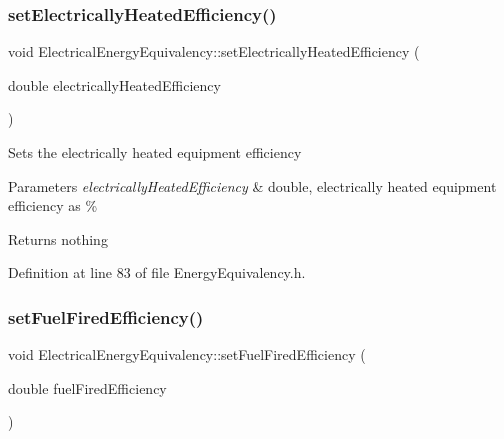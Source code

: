 \subsubsection{\texorpdfstring{set\+Electrically\+Heated\+Efficiency()}{setElectricallyHeatedEfficiency()}\hspace{0.1cm}{\footnotesize\ttfamily [3/3]}}
{\footnotesize\ttfamily void Electrical\+Energy\+Equivalency\+::set\+Electrically\+Heated\+Efficiency (\begin{DoxyParamCaption}\item[{double}]{electrically\+Heated\+Efficiency }\end{DoxyParamCaption})\hspace{0.3cm}{\ttfamily [inline]}}

Sets the electrically heated equipment efficiency


\begin{DoxyParams}{Parameters}
{\em electrically\+Heated\+Efficiency} & double, electrically heated equipment efficiency as \%\\
\hline
\end{DoxyParams}
\begin{DoxyReturn}{Returns}
nothing 
\end{DoxyReturn}


Definition at line 83 of file Energy\+Equivalency.\+h.

\mbox{\label{class_electrical_energy_equivalency_ac73a4dadfeeff737a24b58e805ce9a3a}} 
\subsubsection{\texorpdfstring{set\+Fuel\+Fired\+Efficiency()}{setFuelFiredEfficiency()}\hspace{0.1cm}{\footnotesize\ttfamily [1/3]}}
{\footnotesize\ttfamily void Electrical\+Energy\+Equivalency\+::set\+Fuel\+Fired\+Efficiency (\begin{DoxyParamCaption}\item[{double}]{fuel\+Fired\+Efficiency }\end{DoxyParamCaption})\hspace{0.3cm}{\ttfamily [inline]}}

